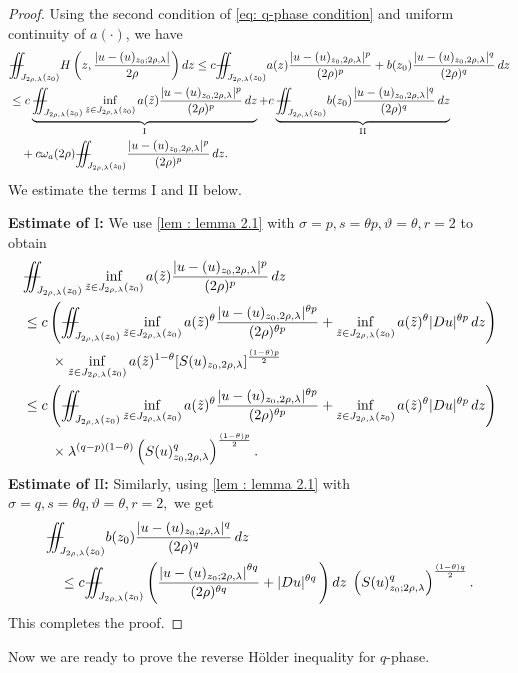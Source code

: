 \documentclass[11pt,oneside, english,reqno,twoside a4paper]{amsart}
\theoremstyle{definition}
\numberwithin{theorem}{section}
\numberwithin{equation}{section}
\newcommand{\iintss}{{\int\hspace{-0.28cm}\int}}
\newcommand{ \miints }{{\iintss\hspace{-0.56cm} -\hspace{-0.15cm}-}}
\newcommand{\miint}[1]{{\miints_{\hspace{-0.13cm}#1}}}
\begin{document}
\begin{proof} Using the second condition of \eqref{eq: q-phase condition} and uniform continuity of $a(\cdot)$, we have
\begin{align*}
&\miint{J_{2 \rho,\lambda}\left(z_0\right)} H\left(z,\frac{\left|u-(u)_{z_0 ; 2 \rho,\lambda}\right|}{2 \rho}\right) d z \leq c\miint{J_{2 \rho,\lambda}\left(z_0\right)} a(z)\frac{|u-(u)_{z_0, 2\rho, \lambda}|^p}{(2\rho)^p}+ b(z_0) \frac{|u-(u)_{z_0, 2\rho, \lambda}|^q}{(2\rho)^q}\, dz\\
&\leq c\underbrace{\miint{J_{2 \rho,\lambda}\left(z_0\right)} \inf_{\tilde{z}\in J_{2\rho, \lambda}(z_0)}a(\tilde{z})\frac{|u-(u)_{z_0, 2\rho, \lambda}|^p}{(2\rho)^p}\,dz}_{\mathrm{I}}+c\underbrace{\miint{J_{2\rho, \lambda}(z_0)}b(z_0) \frac{|u-(u)_{z_0, 2\rho, \lambda}|^q}{(2\rho)^q}\, dz}_{\mathrm{II}}\\
&\quad +c\omega_a(2\rho)\miint{J_{2 \rho,\lambda}\left(z_0\right)} \frac{|u-(u)_{z_0, 2\rho, \lambda}|^p}{(2\rho)^p}\,dz.
\end{align*}
We estimate the terms $\mathrm{I}$ and $\mathrm{II}$ below.

\noindent\textbf{Estimate of $\mathrm{I}$:} We use \cref{lem : lemma 2.1} with $\sigma=p, s=\theta p, \vartheta=\theta, r=2$ to obtain
\begin{align*}
&\miint{J_{2 \rho,\lambda}\left(z_0\right)} \inf_{\tilde{z}\in J_{2\rho, \lambda}(z_0)}a(\tilde{z})\frac{|u-(u)_{z_0, 2\rho, \lambda}|^p}{(2\rho)^p}\,dz\\
&\leq c \left(\miint{J_{2\rho, \lambda}(z_0)}\inf_{\tilde{z}\in J_{2\rho, \lambda}(z_0)} a(\tilde{z})^{\theta}\frac{|u-(u)_{z_0, 2\rho, \lambda}|^{\theta p}}{(2\rho)^{\theta p}}+\inf_{\tilde{z}\in J_{2\rho, \lambda}(z_0)} a(\tilde{z})^{\theta}|Du|^{\theta p}\, dz\right)\\
&\qquad \times \inf_{\tilde{z}\in J_{2\rho, \lambda}(z_0)} a(\tilde{z})^{1-\theta}[S(u)_{z_0, 2\rho, \lambda}]^{\frac{(1-\theta)p}{2}}\\
&\leq c\left(\miint{J_{2\rho, \lambda}(z_0)}\inf_{\tilde{z}\in J_{2\rho, \lambda}(z_0)} a(\tilde{z})^{\theta}\frac{|u-(u)_{z_0, 2\rho, \lambda}|^{\theta p}}{(2\rho)^{\theta p}}+\inf_{\tilde{z}\in J_{2\rho, \lambda}(z_0)} a(\tilde{z})^{\theta}|Du|^{\theta p}\, dz\right)\\
&\qquad \times \lambda^{(q-p)(1-\theta)}\left(S(u)^q_{z_0, 2\rho, \lambda}\right)^{\frac{(1-\theta)p}{2}}.
\end{align*}
\textbf{Estimate of $\mathrm{II}$:} Similarly, using \cref{lem : lemma 2.1} with $\sigma=q, s=\theta q, \vartheta=\theta, r=2,$ we get
\begin{align*}
&\miint{J_{2\rho, \lambda}(z_0)}b(z_0) \frac{|u-(u)_{z_0, 2\rho, \lambda}|^q}{(2\rho)^q}\, dz\\
&\quad \leq c\miint{J_{2 \rho,\lambda}\left(z_0\right)}\left( \frac{\left|u-(u)_{z_0 ; 2 \rho,\lambda}\right|^{\theta q}}{(2 \rho)^{\theta q}}+|D u|^{\theta q}\,\right) dz \;\left(S(u)^q_{z_0 ; 2 \rho,\lambda}\right)^{\frac{(1-\theta) q}{2}}.
\end{align*}
This completes the proof.
\end{proof}
Now we are ready to prove the reverse H\"{o}lder inequality for $q$-phase.
\end{document}
